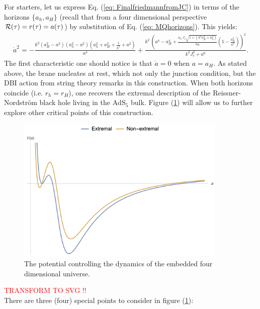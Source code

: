 For starters, let us express Eq. (\ref{eq: FinalfriedmannfromJC}) in terms of the horizons $\{a_{h}, a_{H}\}$ (recall that from a four dimensional perspective $\mathcal{R}(\tau) = r(\tau) = a(\tau)$) by substitution of Eq. (\ref{eq: MQhorizons}). This yields:
\begin{equation}\label{eq: potential_extremal_subs}
\begin{split}
    \dot{a}^{2} = -\frac{k^{2} (a_H^2 - a^2) (a_h^2 - a^2) \left(a_h^2 + a_H^2 + \tfrac{1}{k^2} + a^2\right)}{a^4} +\frac{k^{2}\:\left(a^4-a_{H}^{4}+ \frac{a_{h}\: J_{c}\sqrt{1+ \left(k^2 a_{H}^2 + a_{h}^{2}\right)}}{a_{H}} \left(1-\frac{a_{H}^2}{a^2}\right)\right)^2}{k^{2} J_{c}^2+a^6}.
\end{split}
\end{equation}
The first characteristic one should notice is that $\dot{a} = 0$ when $a = a_{H}$. As stated above, the brane nucleates at rest, which not only the junction condition, but the DBI action from string theory remarks in this construction. When both horizons coincide (i.e. $r_{h}= r_{H}$), one recovers the extremal description of the Reissner-Nordström black hole living in the $\text{AdS}_{5}$ bulk. Figure (\ref{fig: full_potential}) will allow us to further explore other critical points of this construction.
\begin{figure}[h!]
    \centering
    \includegraphics[width=10cm]{Figures/db_pot.png}
    \caption{The potential controlling the dynamics of the embedded four dimensional universe.}
    \label{fig: full_potential}
\end{figure}
\textcolor{red}{TRANSFORM TO SVG !!}\\
There are three (four) special points to consider in figure (\ref{fig: full_potential}):
